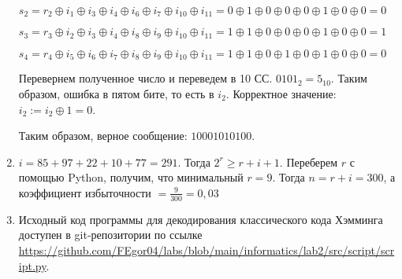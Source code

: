 \begin{enumerate}
    $s_2 = r_2 \oplus i_1 \oplus i_3 \oplus i_4 \oplus i_6 \oplus i_7 \oplus i_{10} \oplus i_{11} =
    0 \oplus 1 \oplus 0 \oplus 0 \oplus 0 \oplus 1 \oplus 0 \oplus 0 = 0
    $

    $
    s_3 = r_3 \oplus i_2 \oplus i_3 \oplus i_4 \oplus i_8 \oplus i_9 \oplus i_{10} \oplus i_{11} =
    1 \oplus 1 \oplus 0 \oplus 0 \oplus 0 \oplus 1 \oplus 0 \oplus 0
    = 1
    $

    $
    s_4 = r_4 \oplus i_5 \oplus i_6 \oplus i_7 \oplus i_8 \oplus i_9 \oplus i_{10} \oplus i_{11} =
    1 \oplus 1 \oplus 0 \oplus 1 \oplus 0 \oplus 1 \oplus 0 \oplus 0 = 0
    $

    Перевернем полученное число и переведем в 10 СС. $0101_2 = 5_{10}$.
    Таким образом, ошибка в пятом бите, то есть в $i_2$.
    Корректное значение: $i_2 := i_2 \oplus 1 = 0$.

    Таким образом, верное сообщение: $10001010100$.

    \item $i = 85 + 97 + 22 + 10 + 77 = 291$. Тогда $2^r \geqslant r + i + 1$. Переберем $r$ с помощью Python, получим,
    что минимальный $r = 9$. Тогда $n = r + i = 300$, а коэффициент избыточности $= \frac{9}{300} = 0{,}03$


    \item Исходный код программы для декодирования классического кода Хэмминга доступен в git-репозитории по ссылке
    \url{https://github.com/FEgor04/labs/blob/main/informatics/lab2/src/script/script.py}.
\end{enumerate}